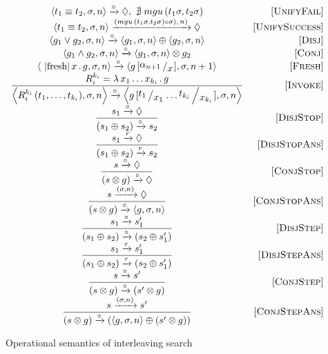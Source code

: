 \begin{figure*}
  \renewcommand{\arraystretch}{1.6}
  \[
  \begin{array}{cr}
    \inbr{t_1 \equiv t_2, \sigma, n} \xrightarrow{\circ} \Diamond , \, \, \nexists\; mgu\,(t_1 \sigma, t_2 \sigma) &\ruleno{UnifyFail} \\
    \inbr{t_1 \equiv t_2, \sigma, n} \xrightarrow{(mgu\,(t_1 \sigma, t_2 \sigma) \circ \sigma),\, n)} \Diamond & \ruleno{UnifySuccess} \\
    \inbr{g_1 \lor g_2, \sigma, n} \xrightarrow{\circ} \inbr{g_1, \sigma, n} \oplus \inbr{g_2, \sigma, n} & \ruleno{Disj} \\
    \inbr{g_1 \land g_2, \sigma, n} \xrightarrow{\circ} \inbr{ g_1, \sigma, n} \otimes g_2 & \ruleno{Conj} \\
    \inbr{\mbox{\lstinline|fresh|}\, x\, .\, g, \sigma, n} \xrightarrow{\circ} \inbr{g\,[\bigslant{\alpha_{n + 1}}{x}], \sigma, n + 1} & \ruleno{Fresh} \\
    \dfrac{R_i^{k_i}=\lambda\,x_1\dots x_{k_i}\,.\,g}{\inbr{R_i^{k_i}\,(t_1,\dots,t_{k_i}),\sigma,n} \xrightarrow{\circ} \inbr{g\,[\bigslant{t_1}{x_1}\dots\bigslant{t_{k_i}}{x_{k_i}}], \sigma, n}} & \ruleno{Invoke}\\
    \dfrac{s_1 \xrightarrow{\circ} \Diamond}{(s_1 \oplus s_2) \xrightarrow{\circ} s_2} & \ruleno{DisjStop}\\
    \dfrac{s_1 \xrightarrow{r} \Diamond}{(s_1 \oplus s_2) \xrightarrow{r} s_2} & \ruleno{DisjStopAns}\\
    \dfrac{s \xrightarrow{\circ} \Diamond}{(s \otimes g) \xrightarrow{\circ} \Diamond} &\ruleno{ConjStop}\\
    \dfrac{s \xrightarrow{(\sigma, n)} \Diamond}{(s \otimes g) \xrightarrow{\circ} \inbr{g, \sigma, n}}  & \ruleno{ConjStopAns}\\
    \dfrac{s_1 \xrightarrow{\circ} s'_1}{(s_1 \oplus s_2) \xrightarrow{\circ} (s_2 \oplus s'_1)} &\ruleno{DisjStep}\\
    \dfrac{s_1 \xrightarrow{r} s'_1}{(s_1 \oplus s_2) \xrightarrow{r} (s_2 \oplus s'_1)} &\ruleno{DisjStepAns}\\
    \dfrac{s \xrightarrow{\circ} s'}{(s \otimes g) \xrightarrow{\circ} (s' \otimes g)} &\ruleno{ConjStep}\\
    \dfrac{s \xrightarrow{(\sigma, n)} s'}{(s \otimes g) \xrightarrow{\circ} (\inbr{g, \sigma, n} \oplus (s' \otimes g))} & \ruleno{ConjStepAns} 
  \end{array}
  \]
  \caption{Operational semantics of interleaving search}
  \label{lts}
\end{figure*}

